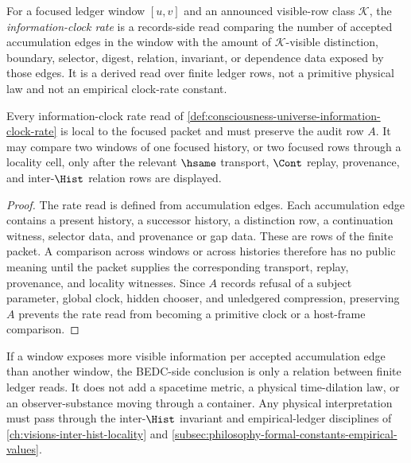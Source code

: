 \begin{definition}
\label{def:consciousness-universe-information-clock-rate}
For a focused ledger window $[u,v]$ and an announced visible-row class $\mathcal{K}$, the \emph{information-clock rate} is a records-side read comparing the number of accepted accumulation edges in the window with the amount of $\mathcal{K}$-visible distinction, boundary, selector, digest, relation, invariant, or dependence data exposed by those edges. It is a derived read over finite ledger rows, not a primitive physical law and not an empirical clock-rate constant.
\end{definition}

\begin{proposition}
\label{prop:consciousness-universe-clock-rate-local-budgeted}
Every information-clock rate read of \autoref{def:consciousness-universe-information-clock-rate} is local to the focused packet and must preserve the audit row $A$. It may compare two windows of one focused history, or two focused rows through a locality cell, only after the relevant $\hsame$ transport, $\Cont$ replay, provenance, and inter-$\Hist$ relation rows are displayed.
\end{proposition}

\begin{proof}
The rate read is defined from accumulation edges. Each accumulation edge contains a present history, a successor history, a distinction row, a continuation witness, selector data, and provenance or gap data. These are rows of the finite packet. A comparison across windows or across histories therefore has no public meaning until the packet supplies the corresponding transport, replay, provenance, and locality witnesses. Since $A$ records refusal of a subject parameter, global clock, hidden chooser, and unledgered compression, preserving $A$ prevents the rate read from becoming a primitive clock or a host-frame comparison.
\end{proof}

\begin{corollary}
\label{cor:consciousness-universe-information-density-no-spacetime-primitive}
If a window exposes more visible information per accepted accumulation edge than another window, the BEDC-side conclusion is only a relation between finite ledger reads. It does not add a spacetime metric, a physical time-dilation law, or an observer-substance moving through a container. Any physical interpretation must pass through the inter-$\Hist$ invariant and empirical-ledger disciplines of \autoref{ch:visions-inter-hist-locality} and \autoref{subsec:philosophy-formal-constants-empirical-values}.
\end{corollary}

